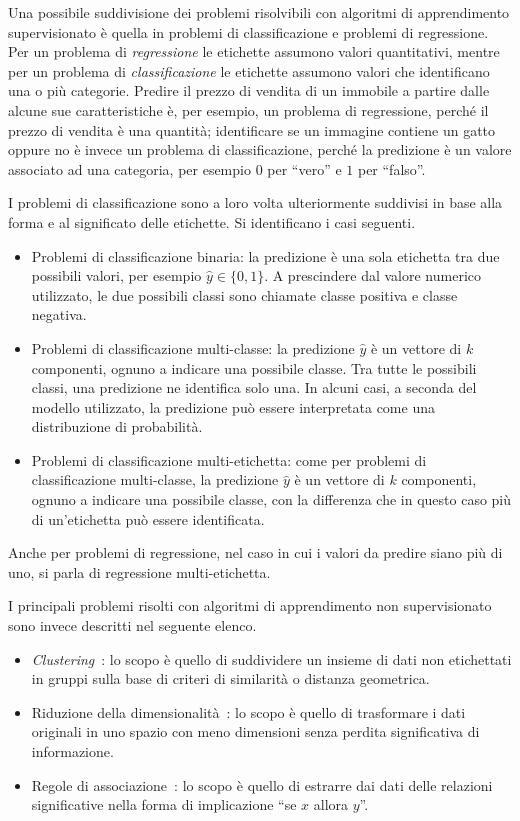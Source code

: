 Una possibile suddivisione dei problemi risolvibili con algoritmi di apprendimento supervisionato è quella in problemi di classificazione e problemi di regressione.
Per un problema di \emph{regressione} le etichette assumono valori quantitativi, mentre per un problema di \emph{classificazione} le etichette assumono valori che identificano una o più categorie. 
Predire il prezzo di vendita di un immobile a partire dalle alcune sue caratteristiche è, per esempio, un problema di regressione, perché il prezzo di vendita è una quantità;
identificare se un immagine contiene un gatto oppure no è invece un problema di classificazione, perché la predizione è un valore associato ad una categoria, per esempio $0$ per ``vero'' e $1$ per ``falso''.

I problemi di classificazione sono a loro volta ulteriormente suddivisi in base alla forma e al significato delle etichette. Si identificano i casi seguenti.
\begin{itemize}
    \item Problemi di classificazione binaria: la predizione è una sola etichetta tra due possibili valori, per esempio $\hat{y} \in \{0,1\}$. A prescindere dal valore numerico utilizzato, le due possibili classi sono chiamate classe positiva e classe negativa.
    \item Problemi di classificazione multi-classe: la predizione $\hat{y}$ è un vettore di $k$ componenti, ognuno a indicare una possibile classe.
    Tra tutte le possibili classi, una predizione ne identifica solo una. 
    In alcuni casi, a seconda del modello utilizzato, la predizione può essere interpretata come una distribuzione di probabilità.  
    \item Problemi di classificazione multi-etichetta: come per problemi di classificazione multi-classe, la predizione $\hat{y}$ è un vettore di $k$ componenti, ognuno a indicare una possibile classe, con la differenza che in questo caso più di un'etichetta può essere identificata. 
\end{itemize}

Anche per problemi di regressione, nel caso in cui i valori da predire siano più di uno, si parla di regressione multi-etichetta.

I principali problemi risolti con algoritmi di apprendimento non supervisionato sono invece descritti nel seguente elenco.
\begin{itemize}
    \item \emph{Clustering}~\cite{elements-of-statistical-learning}: lo scopo è quello di suddividere un insieme di dati non etichettati in gruppi sulla base di criteri di similarità o distanza geometrica.
    \item Riduzione della dimensionalità~\cite{elements-of-statistical-learning}: lo scopo è quello di trasformare i dati originali in uno spazio con meno dimensioni senza perdita significativa di informazione.
    \item Regole di associazione~\cite{elements-of-statistical-learning}: lo scopo è quello di estrarre dai dati delle relazioni significative nella forma di implicazione ``se $x$ allora $y$''.
\end{itemize}


